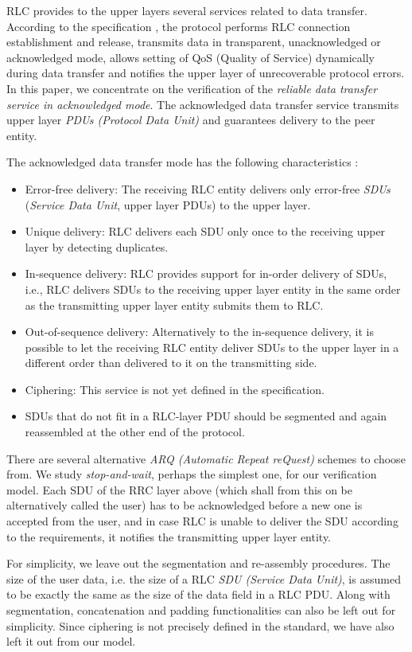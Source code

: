 \documentclass{entcs} \usepackage{entcsmacro}
\begin{document}
RLC provides to the upper layers several services related to data
transfer. According to the specification \cite{3g-RLC}, the protocol
performs RLC connection establishment and release, transmits data in
transparent, unacknowledged or acknowledged mode, allows setting of
QoS (Quality of Service) dynamically during data transfer and
notifies the upper layer of unrecoverable protocol errors. In this
paper, we concentrate on the verification of the {\em reliable data
transfer service in acknowledged mode}.  The acknowledged data
transfer service transmits upper layer \emph{PDUs (Protocol Data
Unit)} and guarantees delivery to the peer entity.

The acknowledged data transfer
mode has the following characteristics \cite{3g-RLC}:
\begin{itemize}
\item Error-free delivery: The receiving RLC entity delivers only error-free
\emph{SDUs} (\emph{Service Data Unit}, upper layer PDUs) to the upper layer.
\item Unique delivery: RLC delivers each SDU only once to the receiving
upper layer by detecting duplicates.
\item In-sequence delivery: RLC provides support for in-order delivery
of SDUs, i.e., RLC delivers SDUs to the receiving upper layer entity in
the same order as the transmitting upper layer entity submits them to RLC.
\item Out-of-sequence delivery: Alternatively to the in-sequence delivery,
it is possible to let the receiving RLC entity deliver SDUs to the
upper layer in a different order than delivered to it on the transmitting side.
\item Ciphering: This service is not yet defined in the specification.
\item SDUs that do not fit in a RLC-layer PDU should be
segmented and again reassembled at the other end of the protocol.
\end{itemize}

There are several alternative \emph{ARQ (Automatic Repeat reQuest)}
schemes to choose from. We study \emph{stop-and-wait}, perhaps the
simplest one, for our verification model. Each SDU of the RRC layer
above (which shall from this on be alternatively called the user) has
to be acknowledged before a new one is accepted from the user, and in
case RLC is unable to deliver the SDU according to the requirements,
it notifies the transmitting upper layer entity.

For simplicity, we leave out the segmentation and re-assembly
procedures.  The size of the user data, i.e. the size of a RLC
\emph{SDU (Service Data Unit)}, is assumed to be exactly the same as
the size of the data field in a RLC PDU. Along with segmentation,
concatenation and padding functionalities can also be left out for
simplicity. Since ciphering is not precisely defined in the standard,
we have also left it out from our model.
\end{document}
